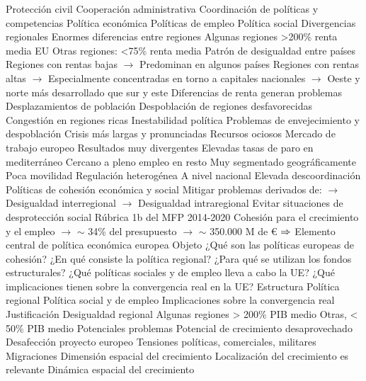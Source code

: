 \documentclass{nuevotema}
\begin{document}
\begin{esquemal}
				\4[] Protección civil
				\4[] Cooperación administrativa
				\4 Coordinación de políticas y competencias
				\4[] Política económica
				\4[] Políticas de empleo
				\4[] Política social
			\3 Divergencias regionales
				\4 Enormes diferencias entre regiones
				\4[] Algunas regiones >200\% renta media EU
				\4[] Otras regiones: <75\% renta media
				\4 Patrón de desigualdad entre países
				\4[] Regiones con rentas bajas
				\4[] $\to$ Predominan en algunos países
				\4[] Regiones con rentas altas
				\4[] $\to$ Especialmente concentradas en torno a capitales nacionales
				\4[] $\to$ Oeste y norte más desarrollado que sur y este
				\4[$\then$] Diferencias de renta generan problemas
				\4[] Desplazamientos de población
				\4[] Despoblación de regiones desfavorecidas
				\4[] Congestión en regiones ricas
				\4[] Inestabilidad política
				\4[] Problemas de envejecimiento y despoblación
				\4[] Crisis más largas y pronunciadas
				\4[] Recursos ociosos
			\3 Mercado de trabajo europeo
				\4 Resultados muy divergentes
				\4[] Elevadas tasas de paro en mediterráneo
				\4[] Cercano a pleno empleo en resto
				\4 Muy segmentado geográficamente
				\4[] Poca movilidad
				\4 Regulación heterogénea
				\4[] A nivel nacional
				\4[] Elevada descoordinación
			\3 Políticas de cohesión económica y social
				\4 Mitigar problemas derivados de:
				\4[] $\to$ Desigualdad interregional
				\4[] $\to$ Desigualdad intraregional
				\4 Evitar situaciones de desprotección social
				\4 Rúbrica 1b del MFP 2014-2020
				\4[] Cohesión para el crecimiento y el empleo
				\4[] $\to$ $\sim$ 34\% del presupuesto
				\4[] $\to$ $\sim$ 350.000 M de €
				\4[] $\then$ Elemento central de política económica europea
		\2 Objeto
			\3 ¿Qué son las políticas europeas de cohesión?
			\3 ¿En qué consiste la política regional?
			\3 ¿Para qué se utilizan los fondos estructurales?
			\3 ¿Qué políticas sociales y de empleo lleva a cabo la UE?
			\3 ¿Qué implicaciones tienen sobre la convergencia real en la UE?
		\2 Estructura
			\3 Política regional
			\3 Política social y de empleo
			\3 Implicaciones sobre la convergencia real
	\1 
		\2 Justificación
			\3 Desigualdad regional
				\4 Algunas regiones > 200\% PIB medio
				\4 Otras, < 50\% PIB medio
				\4[$\then$] Potenciales problemas
				\4[] Potencial de crecimiento desaprovechado
				\4[] Desafección proyecto europeo
				\4[] Tensiones políticas, comerciales, militares
				\4[] Migraciones
			\3 Dimensión espacial del crecimiento
				\4 Localización del crecimiento es relevante
				\4 Dinámica espacial del crecimiento

\end{esquemal}
\end{document}
